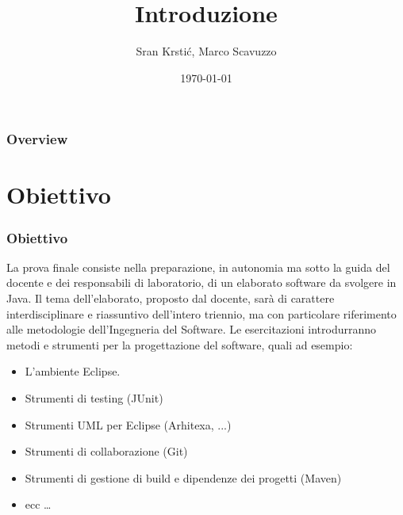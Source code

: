 \documentclass{beamer}
\title[Introduzione]{Introduzione} %
\author{Sr\dj{}an Krsti\'c, Marco Scavuzzo} %
\institute[] %
{
Politecnico di Milano \\ %
\medskip
\textit{srdan.krstic@polimi.it, marco.scavuzzo@.polimi.it} %
}
\date{\today} %
\begin{document}
\begin{frame}
\titlepage %
\end{frame}

\begin{frame}
\frametitle{Overview} %
\tableofcontents %
\end{frame}



\section{Obiettivo}
\begin{frame}
\frametitle{Obiettivo}
La prova finale consiste nella preparazione, in autonomia ma sotto la guida del docente e dei responsabili di laboratorio, di un elaborato software da svolgere in Java. Il tema dell'elaborato,  proposto dal docente, sar\`a  di carattere interdisciplinare e riassuntivo dell'intero triennio, ma con particolare riferimento alle metodologie dell'Ingegneria del Software. Le esercitazioni introdurranno metodi e strumenti per la progettazione del software, quali ad esempio:
\begin{itemize}
\item L'ambiente Eclipse.
\item Strumenti di testing (JUnit)
\item Strumenti UML per Eclipse (Arhitexa, ...)
\item Strumenti di collaborazione (Git)
\item Strumenti di gestione di build e dipendenze  dei progetti (Maven)
\item ecc \ldots
\end{itemize}
\end{frame}
\end{document}
